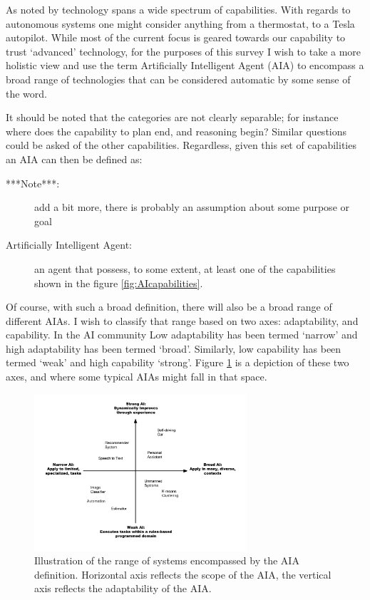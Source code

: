     As noted by \cite{Tripp2011-cq} technology spans a wide spectrum of capabilities. With regards to autonomous systems one might consider anything from a thermostat, to a Tesla autopilot. While most of the current focus is geared towards our capability to trust `advanced' technology, for the purposes of this survey I wish to take a more holistic view and use the term Artificially Intelligent Agent (AIA) to encompass a broad range of technologies that can be considered automatic by some sense of the word.

    It should be noted that the categories are not clearly separable; for instance where does the capability to plan end, and reasoning begin? Similar questions could be asked of the other capabilities. Regardless, given this set of capabilities an AIA can then be defined as:
    
    \begin{description}
    	\item [***Note***:] add a bit more, there is probably an assumption about some purpose or goal
        \item[Artificially Intelligent Agent:] an agent that possess, to some extent, at least one of the capabilities shown in the figure \ref{fig:AIcapabilities}. 
    \end{description}

    Of course, with such a broad definition, there will also be a broad range of different AIAs. I wish to classify that range based on two axes: adaptability, and capability. In the AI community Low adaptability has been termed `narrow' and high adaptability has been termed `broad'. Similarly, low capability has been termed `weak' and high capability `strong'. Figure \ref{fig:StrongWeak} is a depiction of these two axes, and where some typical AIAs might fall in that space.

	\begin{figure}[htbp]
    	\centering
     	\includegraphics[width=0.7\textwidth]{Figures/strong_weak_narrow_broad.pdf}
    	\caption{Illustration of the range of systems encompassed by the AIA definition. Horizontal axis reflects the scope of the AIA, the vertical axis reflects the adaptability of the AIA.}
        \label{fig:StrongWeak}
    \end{figure}

